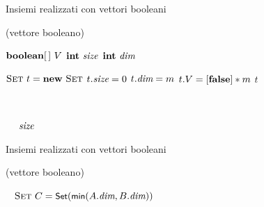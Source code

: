 \begin{frame}[shrink=12]{Insiemi realizzati con vettori booleani}

\vspace{-12pt}
\begin{Procedure}
\caption[A]{\Set (vettore booleano)}

\begin{multicols}{2}
$\BOOLEAN[\,]\ V$\;
$\INTEGER\ \setsize$\;
$\INTEGER\ \setcap$\;
\BlankLine

{
  $\Set\ t = \NEW\ \Set$\;
  $t.\textit{size} = 0$\;
  $t.\textit{dim} = m$\;
	$t.V = [ \FALSE] * m$\;
  \Return $t$\;
}
\BlankLine

\BOOLEAN\ 
{
}
\BlankLine

\INTEGER\ 
{
  \Return\ $\textit{size}$\;
}
\BlankLine

{
}
\BlankLine

{
}
\end{multicols}
\BlankLine
\BlankLine
\end{Procedure}

\end{frame}

\begin{frame}[shrink=12]{Insiemi realizzati con vettori booleani}

\vspace{-12pt}
\begin{Procedure}
\caption[A]{\Set (vettore booleano)}

\bigskip
{}
\Set\ 
{
  $\textsc{Set}\ C = \textsf{{\small Set}}(\textsf{{\small min}}(A.\textit{dim}, B.\textit{dim}))$\;
  {
  }
}
\BlankLine
\BlankLine
\end{Procedure}

\end{frame}

